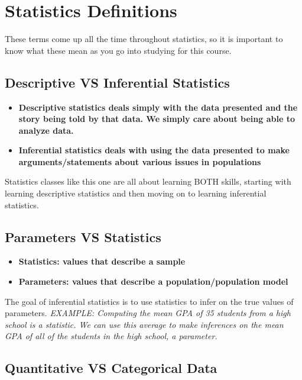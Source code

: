 \section{Statistics Definitions}

These terms come up all the time throughout statistics, so it is important to know what these mean as you go into studying for this course.

\subsection{Descriptive VS Inferential Statistics}

\begin{itemize}
    \item \bf{Descriptive statistics} deals simply with the data presented and the story being told by that data. We simply care about being able to analyze data.
    \item \bf{Inferential statistics} deals with using the data presented to make arguments/statements about various issues in populations
\end{itemize}

Statistics classes like this one are all about learning BOTH skills, starting with learning descriptive statistics and then moving on to learning inferential statistics.



\subsection{Parameters VS Statistics}

\begin{itemize}
    \item \bf{Statistics:} values that describe a sample
    \item \bf{Parameters:} values that describe a population/population model
\end{itemize}

The goal of inferential statistics is to use statistics to infer on the true values of parameters. \it{EXAMPLE: Computing the mean GPA of 35 students from a high school is a statistic. We can use this average to make inferences on the mean GPA of all of the students in the high school, a parameter.}


\subsection{Quantitative VS Categorical Data}

